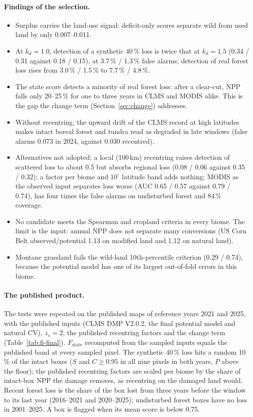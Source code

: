 \documentclass[11pt,a4paper]{article}
\begin{document}
\paragraph{Findings of the selection.}
\begin{itemize}
\item Surplus carries the land-use signal: deficit-only scores separate wild from used land by
only 0.007--0.011.
\item At $k_d = 1.0$, detection of a synthetic 40\,\% loss is twice that at $k_d = 1.5$ (0.34 /
0.31 against 0.18 / 0.15), at 3.7\,\% / 1.3\,\% false alarms; detection of real forest loss rises
from 3.0\,\% / 1.5\,\% to 7.7\,\% / 4.8\,\%.
\item The state score detects a minority of real forest loss: after a clear-cut, NPP falls only
20--25\,\% for one to three years in CLMS and MODIS alike. This is the gap the change term
(Section~\ref{sec:change}) addresses.
\item Without recentring, the upward drift of the CLMS record at high latitudes makes intact
boreal forest and tundra read as degraded in late windows (false alarms 0.073 in 2024, against
0.030 recentred).
\item Alternatives not adopted: a local (100\,km) recentring raises detection of scattered loss to
about 0.5 but absorbs regional loss (0.08 / 0.06 against 0.35 / 0.32); a factor per biome and
$10^\circ$ latitude band adds nothing; MODIS as the observed input separates loss worse (AUC
0.65 / 0.57 against 0.79 / 0.74), has four times the false alarms on undisturbed forest and 84\,\%
coverage.
\item No candidate meets the Spearman and cropland criteria in every biome. The limit is the
input: annual NPP does not separate many conversions (US Corn Belt observed/potential 1.13 on
modified land and 1.12 on natural land).
\item Montane grassland fails the wild-land 10th-percentile criterion (0.29 / 0.74), because the
potential model has one of its largest out-of-fold errors in this biome.
\end{itemize}

\paragraph{The published product.} The tests were repeated on the published maps of reference
years 2021 and 2025, with the published inputs (CLMS DMP V2.0.2, the final potential model and
natural CV), $z_s = 2$, the published recentring factors and the change term
(Table~\ref{tab:fi-final}). $F_{\text{state}}$ recomputed from the sampled inputs equals the
published band at every sampled pixel. The synthetic 40\,\% loss hits a random 10\,\% of the
intact boxes ($S$ and $C \ge 0.95$ in all nine pixels in both years, $P$ above the floor); the
published recentring factors are scaled per biome by the share of intact-box NPP the damage
removes, as recentring on the damaged land would. Recent forest loss is the share of the box lost
from three years before the window to its last year (2016--2021 and 2020--2025); undisturbed
forest boxes have no loss in 2001--2025. A box is flagged when its mean score is below 0.75.
\end{document}
